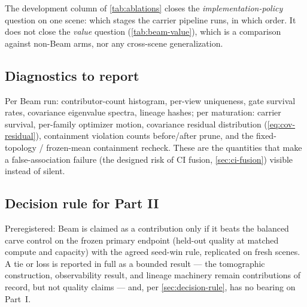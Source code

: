 The development column of \cref{tab:ablations} closes the \emph{implementation-policy}
question on one scene: which stages the carrier pipeline runs, in which order.  It does not
close the \emph{value} question (\cref{tab:beam-value}), which is a comparison against
non-Beam arms, nor any cross-scene generalization.

\subsection{Diagnostics to report}
\label{sec:exp2-diagnostics}

Per Beam run: contributor-count histogram, per-view uniqueness, gate survival rates,
covariance eigenvalue spectra, lineage hashes; per maturation: carrier survival, per-family
optimizer motion, covariance residual distribution (\cref{eq:cov-residual}), containment
violation counts before/after prune, and the fixed-topology / frozen-mean containment
recheck.  These are the quantities that make a false-association failure (the designed risk
of CI fusion, \cref{sec:ci-fusion}) visible instead of silent.

\begin{figure}[t]
  \centering
  \caption{}
  \label{fig:beam-diagnostics}
\end{figure}

\subsection{Decision rule for Part II}
\label{sec:exp2-decision}

Preregistered: Beam is claimed as a contribution only if it beats the balanced carve control
on the frozen primary endpoint (held-out quality at matched compute and capacity) with the
agreed seed-win rule, replicated on fresh scenes.  
A tie or loss is reported in full as a bounded result --- the tomographic construction,
observability result, and lineage machinery remain contributions of record, but not
quality claims --- and, per \cref{sec:decision-rule}, has no bearing on Part~I.
